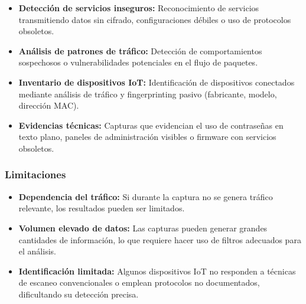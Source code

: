 \documentclass[a4paper, 11pt]{article}
\begin{document}
\begin{itemize}
    \item \textbf{Detección de servicios inseguros:} Reconocimiento de servicios transmitiendo datos sin cifrado, configuraciones débiles o uso de protocolos obsoletos.
    
    \item \textbf{Análisis de patrones de tráfico:} Detección de comportamientos sospechosos o vulnerabilidades potenciales en el flujo de paquetes.

    \item \textbf{Inventario de dispositivos IoT:} Identificación de dispositivos conectados mediante análisis de tráfico y fingerprinting pasivo (fabricante, modelo, dirección MAC).

    \item \textbf{Evidencias técnicas:} Capturas que evidencian el uso de contraseñas en texto plano, paneles de administración visibles o firmware con servicios obsoletos.

\end{itemize}

\vspace{0.5cm}
\subsubsection*{Limitaciones}

\begin{itemize}
    \item \textbf{Dependencia del tráfico:} Si durante la captura no se genera tráfico relevante, los resultados pueden ser limitados.
        
    \item \textbf{Volumen elevado de datos:} Las capturas pueden generar grandes cantidades de información, lo que requiere hacer uso de filtros adecuados para el análisis.

    \item \textbf{Identificación limitada:} Algunos dispositivos IoT no responden a técnicas de escaneo convencionales o emplean protocolos no documentados, dificultando su detección precisa.

\end{itemize}

\par\vspace{0.5cm}
\end{document}
